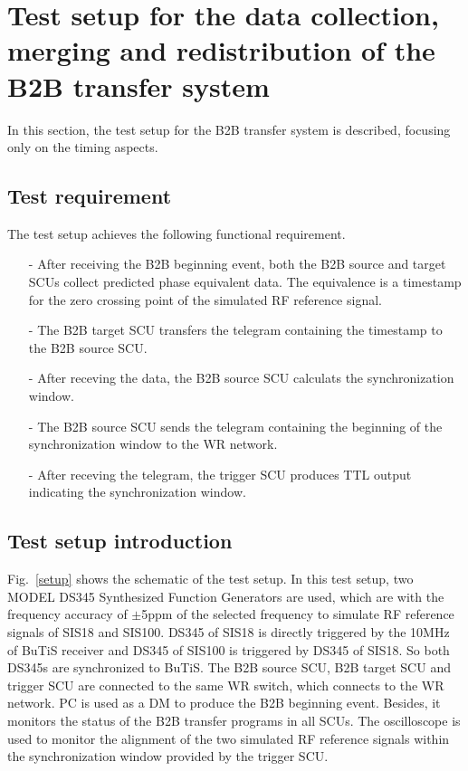 \section{Test setup for the data collection, merging and redistribution of the B2B transfer system}

In this section, the test setup for the B2B transfer system is described, focusing only on the timing aspects.  

\subsection{Test requirement}
The test setup achieves the following functional requirement.
\begin{itemize}
\item[-] After receiving the B2B beginning event, both the B2B source and target SCUs collect predicted phase equivalent data. The equivalence is a timestamp for the zero crossing point of the simulated RF reference signal. 
\item[-] The B2B target SCU transfers the telegram containing the timestamp to the B2B source SCU.
\item[-] After receving the data, the B2B source SCU calculats the synchronization window.
\item[-] The B2B source SCU sends the telegram containing the beginning of the synchronization window to the WR network.
\item[-] After receving the telegram, the trigger SCU produces TTL output indicating the synchronization window. 
\end{itemize}

\subsection{Test setup introduction}
Fig.~\ref{setup} shows the schematic of the test setup. In this test setup, two MODEL DS345 Synthesized Function Generators are used, which are with the frequency accuracy of $\pm$5ppm of the selected frequency to simulate RF reference signals of SIS18 and SIS100. DS345 of SIS18 is directly triggered by the 10MHz of BuTiS receiver and DS345 of SIS100 is triggered by DS345 of SIS18. So both DS345s are synchronized to BuTiS. The B2B source SCU, B2B target SCU and trigger SCU are connected to the same WR switch, which connects to the WR network. PC is used as a DM to produce the B2B beginning event. Besides, it monitors the status of the B2B transfer programs in all SCUs. The oscilloscope is used to monitor the alignment of the two simulated RF reference signals within the synchronization window provided by the trigger SCU.   

